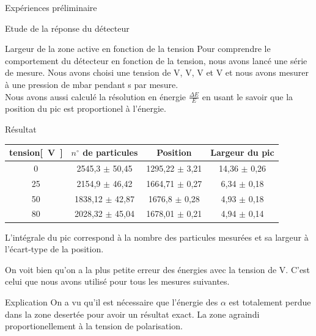 \documentclass[a4paper,11pt]{scrartcl}
\begin{document}
\begin{section}{Expériences préliminaire}
\begin{subsection}{Etude de la réponse du détecteur}
   \begin{subsubsection}{Largeur de la zone active en fonction de la tension}
    Pour comprendre le comportement du détecteur en fonction de la tension, nous avons lancé une série de mesure. Nous avons choisi une tension de \unit[0]{V}, \unit[25]{V}, \unit[50]{V} et \unit[80]{V} et nous avons mesurer à une pression de \unit[0,78]{mbar} pendant \unit[30]{s} par mesure.\\
    Nous avons aussi calculé la résolution en énergie $\frac{\Delta E}{E}$ en usant le savoir que la position du pic est proportionel à l'énergie.
    \begin{paragraph}{Résultat} 
     \begin{center}
      \begin{tabular}{c|c|c|c|}
       tension\unit{[V]} & $n^{\circ}$ de particules & Position	& Largeur du pic 	\\ \hline 
       0	&	2545,3  $\pm$ 50,45	&	1295,22	$\pm$ 3,21	&	14,36 $\pm$ 0,26		\\ 
       25	&	2154,9 $\pm$ 46,42	&	1664,71	$\pm$ 0,27	&	6,34 $\pm$ 0,18		\\ 
       50	&	1838,12 $\pm$ 42,87	&	1676,8	$\pm$ 0,28	&	4,93 $\pm$ 0,18		\\ 
       80	&	2028,32 $\pm$ 45,04	&	1678,01	$\pm$ 0,21	&	4,94 $\pm$ 0,14		\\ 
      \end{tabular}
     \end{center}
     L'intégrale du pic correspond à la nombre des particules mesurées et sa largeur à l'écart-type de la position.
 
     On voit bien qu'on a la plus petite erreur des  énergies avec la tension de \unit[80]{V}. C'est celui que nous avons utilisé pour tous les mesures suivantes. 
    \end{paragraph}

    \begin{paragraph}{Explication}
     On a vu qu'il est nécessaire que l'énergie des $\alpha$ est totalement perdue dans la zone desertée pour avoir un résultat exact. La zone agraindi proportionellement à la tension de polarisation.
    \end{paragraph}
   \end{subsubsection}
  \end{subsection} 


\end{section}
\end{document}
